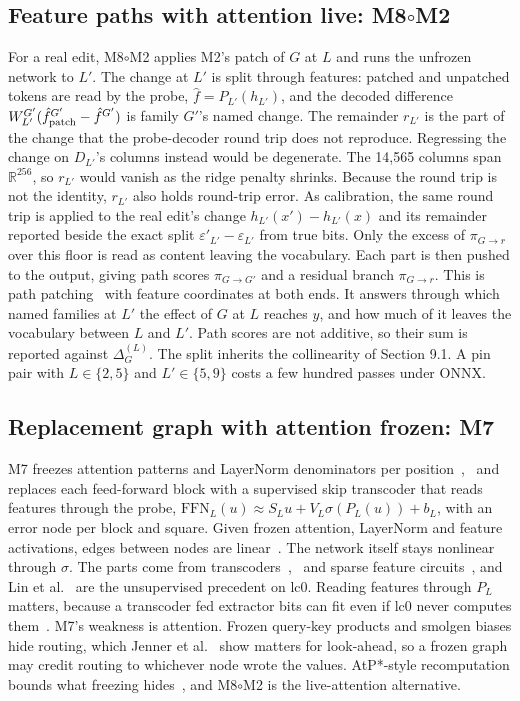 \documentclass[conference]{IEEEtran}
\begin{document}
\subsection{Feature paths with attention live: M8\texorpdfstring{$\circ$}{o}M2}\label{sec:8.3}
For a real edit, M8$\circ$M2 applies M2's patch of $G$ at $L$ and runs the unfrozen network to $L'$. The change at $L'$ is split through features: patched and unpatched tokens are read by the probe, $\hat f=P_{L'}(h_{L'})$, and the decoded difference $W^{G'}_{L'}(\hat f^{G'}_{\rm patch}-\hat f^{G'})$ is family $G'$'s named change. The remainder $r_{L'}$ is the part of the change that the probe-decoder round trip does not reproduce. Regressing the change on $D_{L'}$'s columns instead would be degenerate. The 14,565 columns span $\mathbb R^{256}$, so $r_{L'}$ would vanish as the ridge penalty shrinks. Because the round trip is not the identity, $r_{L'}$ also holds round-trip error. As calibration, the same round trip is applied to the real edit's change $h_{L'}(x')-h_{L'}(x)$ and its remainder reported beside the exact split $\varepsilon'_{L'}-\varepsilon_{L'}$ from true bits. Only the excess of $\pi_{G\to r}$ over this floor is read as content leaving the vocabulary. Each part is then pushed to the output, giving path scores $\pi_{G\to G'}$ and a residual branch $\pi_{G\to r}$. This is path patching~\cite{goldowsky2023} with feature coordinates at both ends. It answers through which named families at $L'$ the effect of $G$ at $L$ reaches $y$, and how much of it leaves the vocabulary between $L$ and $L'$. Path scores are not additive, so their sum is reported against $\Delta^{(L)}_G$. The split inherits the collinearity of Section 9.1. A pin pair with $L\in\{2,5\}$ and $L'\in\{5,9\}$ costs a few hundred passes under ONNX.

\subsection{Replacement graph with attention frozen: M7}\label{sec:8.4}
M7 freezes attention patterns and LayerNorm denominators per position~\cite{ali2022},~\cite{ameisen2025} and replaces each feed-forward block with a supervised skip transcoder that reads features through the probe, $\mathrm{FFN}_L(u)\approx S_Lu+V_L\sigma(P_L(u))+b_L$, with an error node per block and square. Given frozen attention, LayerNorm and feature activations, edges between nodes are linear~\cite{ameisen2025}. The network itself stays nonlinear through $\sigma$. The parts come from transcoders~\cite{dunefsky2024},~\cite{paulo2025} and sparse feature circuits~\cite{marks2025}, and Lin et al.~\cite{lin2026} are the unsupervised precedent on lc0. Reading features through $P_L$ matters, because a transcoder fed extractor bits can fit even if lc0 never computes them~\cite{mahinpei2021}. M7's weakness is attention. Frozen query-key products and smolgen biases hide routing, which Jenner et al.~\cite{jenner2024} show matters for look-ahead, so a frozen graph may credit routing to whichever node wrote the values. AtP*-style recomputation bounds what freezing hides~\cite{kramar2024}, and M8$\circ$M2 is the live-attention alternative.
\end{document}
